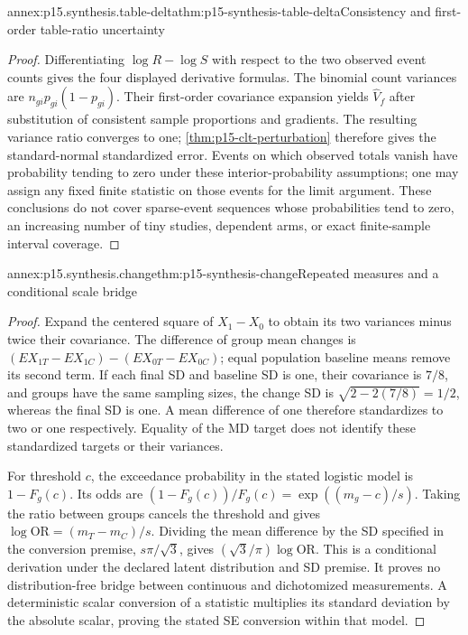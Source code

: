 \begin{annexitem}{annex:p15.synthesis.table-delta}{thm:p15-synthesis-table-delta}{Consistency and first-order table-ratio uncertainty}
\begin{proof}
Differentiating \(\log R-\log S\) with respect to the two observed
event counts gives the four displayed derivative formulas. The binomial
count variances are \(n_{gi}p_{gi}(1-p_{gi})\). Their first-order
covariance expansion yields \(\widehat V_f\) after substitution of
consistent sample proportions and gradients. The resulting variance ratio
converges to one; \ref{thm:p15-clt-perturbation} therefore gives the
standard-normal standardized error. Events on which observed totals vanish
have probability tending to zero under these interior-probability assumptions;
one may assign any fixed finite statistic on those events for the limit
argument. These conclusions do not cover sparse-event sequences whose
probabilities tend to zero, an increasing number of tiny studies, dependent
arms, or exact finite-sample interval coverage.
\end{proof}
\end{annexitem}

\begin{annexitem}{annex:p15.synthesis.change}{thm:p15-synthesis-change}{Repeated measures and a conditional scale bridge}
\begin{proof}
Expand the centered square of \(X_1-X_0\) to obtain its two variances
minus twice their covariance. The difference of group mean changes is
\((EX_{1T}-EX_{1C})-(EX_{0T}-EX_{0C})\); equal population baseline
means remove its second term. If each final SD and baseline SD is one,
their covariance is \(7/8\), and groups have the same sampling sizes,
the change SD is \(\sqrt{2-2(7/8)}=1/2\),
whereas the final SD is one. A mean difference of one therefore standardizes
to two or one respectively. Equality of the MD target does not identify
these standardized targets or their variances.

For threshold \(c\), the exceedance probability in the stated logistic
model is \(1-F_g(c)\). Its odds are
\((1-F_g(c))/F_g(c)=\exp((m_g-c)/s)\).
Taking the ratio between groups cancels the threshold and gives
\(\log\mathrm{OR}=(m_T-m_C)/s\).
Dividing the mean difference by the SD specified in the conversion premise,
\(s\pi/\sqrt3\), gives \((\sqrt3/\pi)\log\mathrm{OR}\).
This is a conditional derivation under the declared latent distribution and
SD premise. It proves no distribution-free bridge between continuous and
dichotomized measurements. A deterministic scalar conversion of a statistic
multiplies its standard deviation by the absolute scalar, proving the stated
SE conversion within that model.
\end{proof}
\end{annexitem}

